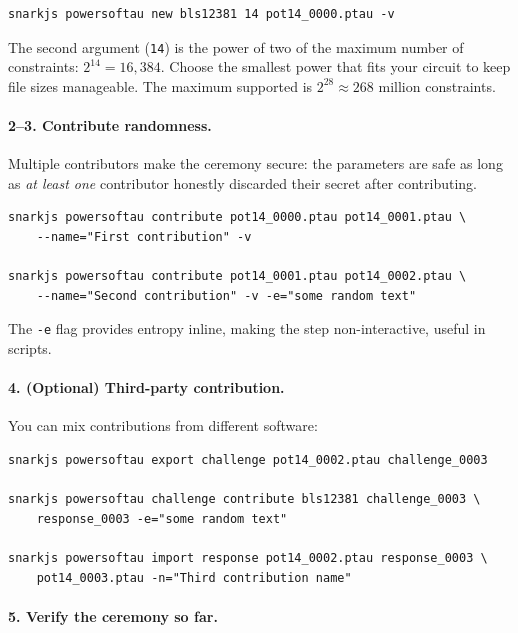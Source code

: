 \begin{verbatim}
snarkjs powersoftau new bls12381 14 pot14_0000.ptau -v
\end{verbatim}

The second argument (\texttt{14}) is the power of two of the maximum number of constraints: $2^{14} = 16{,}384$. Choose the smallest power that fits your circuit to keep file sizes manageable. The maximum supported is $2^{28} \approx 268$ million constraints.

\paragraph{2--3. Contribute randomness.}

Multiple contributors make the ceremony secure: the parameters are safe as long as \emph{at least one} contributor honestly discarded their secret after contributing.

\begin{verbatim}
snarkjs powersoftau contribute pot14_0000.ptau pot14_0001.ptau \
    --name="First contribution" -v

snarkjs powersoftau contribute pot14_0001.ptau pot14_0002.ptau \
    --name="Second contribution" -v -e="some random text"
\end{verbatim}

The \texttt{-e} flag provides entropy inline, making the step non-interactive, useful in scripts.

\paragraph{4. (Optional) Third-party contribution.}

You can mix contributions from different software:

\begin{verbatim}
snarkjs powersoftau export challenge pot14_0002.ptau challenge_0003

snarkjs powersoftau challenge contribute bls12381 challenge_0003 \
    response_0003 -e="some random text"

snarkjs powersoftau import response pot14_0002.ptau response_0003 \
    pot14_0003.ptau -n="Third contribution name"
\end{verbatim}

\paragraph{5. Verify the ceremony so far.}

